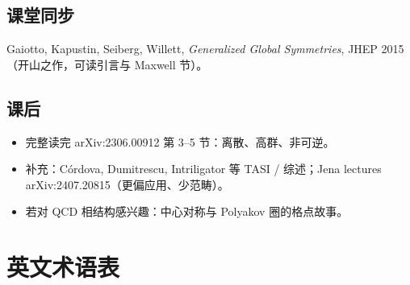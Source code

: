 \documentclass[11pt,a4paper]{article}
\theoremstyle{definition}
\theoremstyle{plain}
\theoremstyle{remark}
\begin{document}
\subsection{课堂同步}

Gaiotto, Kapustin, Seiberg, Willett, \emph{Generalized Global Symmetries}, JHEP 2015（开山之作，可读引言与 Maxwell 节）。

\subsection{课后}

\begin{itemize}[leftmargin=1.4em]
  \item 完整读完 arXiv:2306.00912 第 3--5 节：离散、高群、非可逆。
  \item 补充：C\'ordova, Dumitrescu, Intriligator 等 TASI / 综述；Jena lectures arXiv:2407.20815（更偏应用、少范畴）。
  \item 若对 QCD 相结构感兴趣：中心对称与 Polyakov 圈的格点故事。
\end{itemize}

\section{英文术语表}
\label{sec:glossary}
\end{document}

